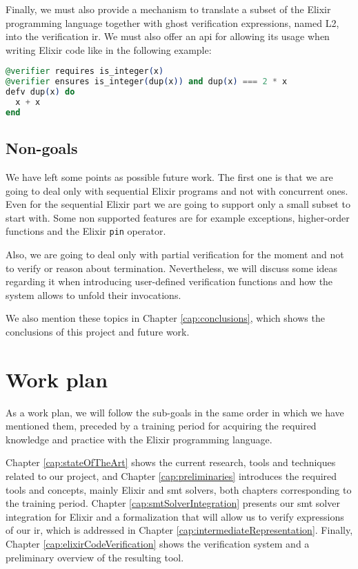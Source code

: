 Finally, we must also provide a mechanism to translate a subset of the Elixir
programming language together with ghost verification expressions, named L2,
into the verification \gls{ir}. We must also offer an \gls{api} for allowing its
usage when writing Elixir code like in the following example:

\begin{lstlisting}[language=elixir,numbers=none,frame=none]
@verifier requires is_integer(x)
@verifier ensures is_integer(dup(x)) and dup(x) === 2 * x
defv dup(x) do
  x + x
end
\end{lstlisting}

\subsection{Non-goals}

We have left some points as possible future work. The first one is that we are
going to deal only with sequential Elixir programs and not with concurrent ones.
Even for the sequential Elixir part we are going to support only a small subset 
to start with. Some non supported features are for example exceptions,
higher-order functions and the Elixir \verb|pin| operator.

Also, we are going to deal only with partial verification for the moment and not
to verify or reason about termination. Nevertheless, we will discuss some ideas 
regarding it when introducing user-defined verification functions and how the 
system allows to unfold their invocations.  

We also mention these topics in Chapter \ref{cap:conclusions}, which shows the 
conclusions of this project and future work.

\section{Work plan}

As a work plan, we will follow the sub-goals in the same order in which we have
mentioned them, preceded by a training period for acquiring the required
knowledge and practice with the Elixir programming language.

Chapter \ref{cap:stateOfTheArt} shows the current research, tools and techniques
related to our project, and Chapter \ref{cap:preliminaries} introduces the
required tools and concepts, mainly Elixir and \acrshort{smt} solvers, both
chapters corresponding to the training period. Chapter
\ref{cap:smtSolverIntegration} presents our \acrshort{smt} solver integration
for Elixir and a formalization that will allow us to verify expressions of our
\gls{ir}, which is addressed in Chapter \ref{cap:intermediateRepresentation}.
Finally, Chapter \ref{cap:elixirCodeVerification} shows the verification system
and a preliminary overview of the resulting tool.
